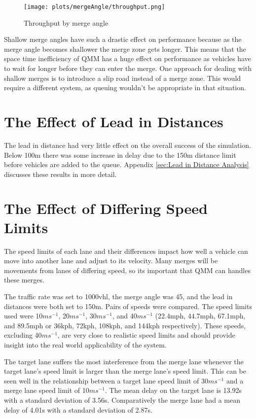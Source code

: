 \begin{figure}[htb]
\centering
\texttt{[image: plots/mergeAngle/throughput.png]}
\caption{Throughput by merge angle}
\label{fig:throughputMergeAngle}
\end{figure}

Shallow merge angles have such a drastic effect on performance because as the merge angle becomes shallower the merge zone gets longer. This means that the space time inefficiency of QMM has a huge effect on performance as vehicles have to wait for longer before they can enter the merge. One approach for dealing with shallow merges is to introduce a slip road instead of a merge zone. This would require a different system, as queuing wouldn't be appropriate in that situation.

\section{The Effect of Lead in Distances}
\label{sec:The Effect of Lead in Distances}
The lead in distance had very little effect on the overall success of the simulation. Below 100\si{m} there was some increase in delay due to the 150\si{m} distance limit before vehicles are added to the queue. Appendix \ref{sec:Lead in Distance Analysis} discusses these results in more detail.

\section{The Effect of Differing Speed Limits}
\label{sec:The Effect of Differing Speed Limits}
The speed limits of each lane and their differences impact how well a vehicle can move into another lane and adjust to its velocity. Many merges will be movements from lanes of differing speed, so its important that QMM can handles these merges.

The traffic rate was set to 1000\si{vhl}, the merge angle was 45\degree, and the lead in distances were both set to 150\si{m}. Pairs of speeds were compared. The speed limits used were 10$\si{ms^{-1}}$, 20$\si{ms^{-1}}$, 30$\si{ms^{-1}}$, and 40$\si{ms^{-1}}$ (22.4\si{mph}, 44.7\si{mph}, 67.1\si{mph}, and 89.5\si{mph} or 36\si{kph}, 72\si{kph}, 108\si{kph}, and 144\si{kph} respectively). These speeds, excluding 40$\si{ms^{-1}}$, are very close to realistic speed limits and should provide insight into the real world applicability of the system.

The target lane suffers the most interference from the merge lane whenever the target lane's speed limit is larger than the merge lane's speed limit. This can be seen well in the relationship between a target lane speed limit of 30$\si{ms^{-1}}$ and a merge lane speed limit of 10$\si{ms^{-1}}$. The mean delay on the target lane is 13.92\si{s} with a standard deviation of 3.56\si{s}. Comparatively the merge lane had a mean delay of 4.01\si{s} with a standard deviation of 2.87\si{s}. 

